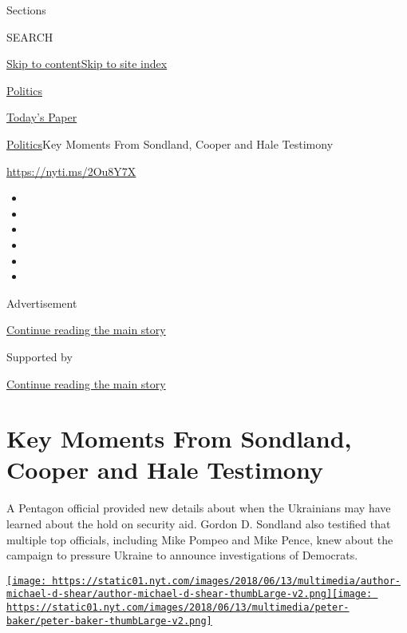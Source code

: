 Sections

SEARCH

\protect\hyperlink{site-content}{Skip to
content}\protect\hyperlink{site-index}{Skip to site index}

\href{https://www.nytimes.com/section/politics}{Politics}

\href{https://myaccount.nytimes.com/auth/login?response_type=cookie\&client_id=vi}{}

\href{https://www.nytimes.com/section/todayspaper}{Today's Paper}

\href{/section/politics}{Politics}\textbar{}Key Moments From Sondland,
Cooper and Hale Testimony

\url{https://nyti.ms/2Ou8Y7X}

\begin{itemize}
\item
\item
\item
\item
\item
\item
\end{itemize}

Advertisement

\protect\hyperlink{after-top}{Continue reading the main story}

Supported by

\protect\hyperlink{after-sponsor}{Continue reading the main story}

\hypertarget{key-moments-from-sondland-cooper-and-hale-testimony}{%
\section{Key Moments From Sondland, Cooper and Hale
Testimony}\label{key-moments-from-sondland-cooper-and-hale-testimony}}

A Pentagon official provided new details about when the Ukrainians may
have learned about the hold on security aid. Gordon D. Sondland also
testified that multiple top officials, including Mike Pompeo and Mike
Pence, knew about the campaign to pressure Ukraine to announce
investigations of Democrats.

\href{https://www.nytimes.com/by/michael-d-shear}{\texttt{[image: https://static01.nyt.com/images/2018/06/13/multimedia/author-michael-d-shear/author-michael-d-shear-thumbLarge-v2.png]}}\href{https://www.nytimes.com/by/peter-baker}{\texttt{[image: https://static01.nyt.com/images/2018/06/13/multimedia/peter-baker/peter-baker-thumbLarge-v2.png]}}

